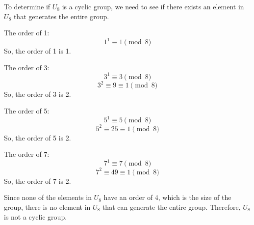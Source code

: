 To determine if \( U_8 \) is a cyclic group, we need to see if there exists an element in \( U_8 \) that generates the entire group. 

The order of 1:
  \[
  1^1 \equiv 1 \pmod{8}
  \]
  So, the order of 1 is 1.

The order of 3:
  \[
  3^1 \equiv 3 \pmod{8}
  \]
  \[
  3^2 \equiv 9 \equiv 1 \pmod{8}
  \]
  So, the order of 3 is 2.

The order of 5:
  \[
  5^1 \equiv 5 \pmod{8}
  \]
  \[
  5^2 \equiv 25 \equiv 1 \pmod{8}
  \]
  So, the order of 5 is 2.

The order of 7:
  \[
  7^1 \equiv 7 \pmod{8}
  \]
  \[
  7^2 \equiv 49 \equiv 1 \pmod{8}
  \]
  So, the order of 7 is 2.

Since none of the elements in \( U_8 \) have an order of 4, which is the size of the group, there is no element in \( U_8 \) that can generate the entire group. Therefore, \( U_8 \) is not a cyclic group.
